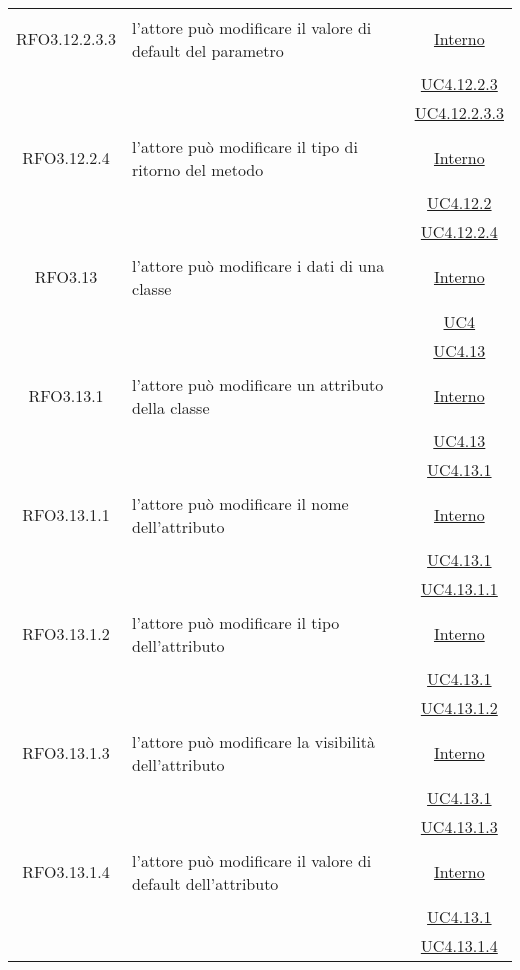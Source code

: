 \begin{longtable}{|c|>{\centering}m{7cm}|c|}
\hypertarget{RFO3.12.2.3.3}{RFO3.12.2.3.3} & l'attore può modificare il valore di default del parametro & \hyperlink{Interno}{Interno}\\
& &\hyperref[UC4.12.2.3]{UC4.12.2.3}\\
& &\hyperref[UC4.12.2.3.3]{UC4.12.2.3.3}\\ \hline

\hypertarget{RFO3.12.2.4}{RFO3.12.2.4} & l'attore può modificare il tipo di ritorno del metodo & \hyperlink{Interno}{Interno}\\
& &\hyperref[UC4.12.2]{UC4.12.2}\\
& &\hyperref[UC4.12.2.4]{UC4.12.2.4}\\ \hline

\hypertarget{RFO3.13}{RFO3.13} & l'attore può modificare i dati di una classe & \hyperlink{Interno}{Interno}\\
& &\hyperref[UC4]{UC4}\\
& &\hyperref[UC4.13]{UC4.13}\\ \hline

\hypertarget{RFO3.13.1}{RFO3.13.1} & l'attore può modificare un attributo della classe & \hyperlink{Interno}{Interno}\\
& &\hyperref[UC4.13]{UC4.13}\\
& &\hyperref[UC4.13.1]{UC4.13.1}\\ \hline

\hypertarget{RFO3.13.1.1}{RFO3.13.1.1} & l'attore può modificare il nome dell'attributo & \hyperlink{Interno}{Interno}\\
& &\hyperref[UC4.13.1]{UC4.13.1}\\
& &\hyperref[UC4.13.1.1]{UC4.13.1.1}\\ \hline

\hypertarget{RFO3.13.1.2}{RFO3.13.1.2} & l'attore può modificare il tipo dell'attributo & \hyperlink{Interno}{Interno}\\
& &\hyperref[UC4.13.1]{UC4.13.1}\\
& &\hyperref[UC4.13.1.2]{UC4.13.1.2}\\ \hline

\hypertarget{RFO3.13.1.3}{RFO3.13.1.3} & l'attore può modificare la visibilità dell'attributo & \hyperlink{Interno}{Interno}\\
& &\hyperref[UC4.13.1]{UC4.13.1}\\
& &\hyperref[UC4.13.1.3]{UC4.13.1.3}\\ \hline

\hypertarget{RFO3.13.1.4}{RFO3.13.1.4} & l'attore può modificare il valore di default dell'attributo & \hyperlink{Interno}{Interno}\\
& &\hyperref[UC4.13.1]{UC4.13.1}\\
& &\hyperref[UC4.13.1.4]{UC4.13.1.4}\\ \hline


\end{longtable}
